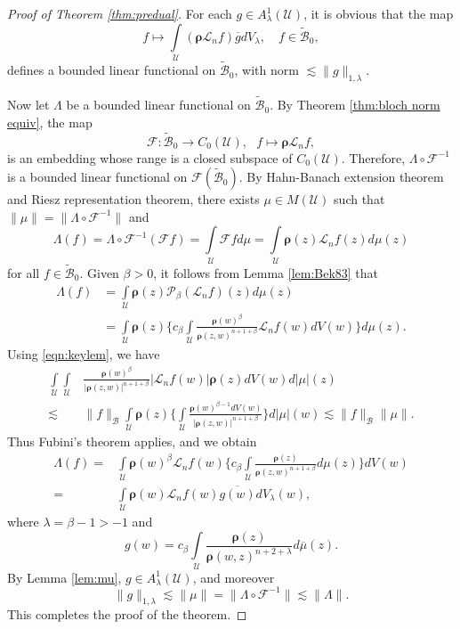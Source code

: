 \documentclass[10pt,a4paper]{amsart}
\newcommand{\bfL}{\mathcal{L}}
\newcommand{\bfrho}{\boldsymbol{\rho}}
\newcommand{\calB}{\mathcal{B}}
\newcommand{\calU}{\mathcal{U}}
\begin{document}
\begin{proof}[Proof of Theorem \ref{thm:predual}]
For each $g\in A_\lambda^1(\calU)$, it is obvious that the map
\[
f \longmapsto  \int\limits_{\calU} (\bfrho \bfL_n f )\overline{g} dV_\lambda,\quad f\in\widetilde{\calB}_0,
\]
defines a bounded linear functional on $\widetilde{\calB}_0$,  with norm $\lesssim\|g\|_{1,\lambda}$.

Now let $\Lambda$ be a bounded linear functional on $\widetilde{\calB}_0$.  
By Theorem \ref{thm:bloch norm equiv}, the map
\begin{equation*}\label{eq:map_L}
\mathcal{F}:\widetilde{\calB}_0 \to C_0(\calU),\ \ \ f \mapsto  \bfrho \bfL_n f,
\end{equation*}
is an embedding whose range is a closed subspace of $C_0(\calU)$.
Therefore, $\Lambda\circ \mathcal{F}^{-1}$
is a bounded linear functional on $\mathcal{F}(\widetilde{\calB}_0)$.
By Hahn-Banach extension theorem and Riesz representation theorem, there exists $\mu\in M(\calU)$ such that
$ \|\mu\|=\|\Lambda\circ \mathcal{F}^{-1}\|$ and
\[
\Lambda (f) = \Lambda\circ \mathcal{F}^{-1} (\mathcal{F} f) = \int\limits_{\calU} \mathcal{F} f d\mu
= \int\limits_{\calU} \bfrho(z) \bfL_n f(z) d\mu(z)
\]
for all $f\in \widetilde{\calB}_0$. Given $\beta>0$, it follows from Lemma \ref{lem:Bek83} that
\begin{align*}
\Lambda (f)&= \int\limits_{\calU} \bfrho(z) \mathcal{P}_\beta(\bfL_nf)(z) d\mu(z)\\
&= \int\limits_{\calU} \bfrho(z) \bigg\{ c_\beta
\int\limits_{\calU} \frac{\bfrho(w)^\beta}{\bfrho(z,w)^{n+1+\beta}} \bfL_n f(w) dV(w) \bigg\} d\mu(z).
\end{align*}
Using \eqref{eqn:keylem}, we have
\begin{align*}
\int\limits_{\calU} \int\limits_{\calU} & \frac {\bfrho(w)^\beta}{|\bfrho(z,w)|^{n+1+\beta}} |\bfL_n f(w)| \bfrho(z) dV(w) d|\mu|(z)\\
\lesssim &  \|f\|_{\calB} \int\limits_{\calU} \bfrho(z) \bigg\{\int\limits_{\calU}  \frac {\bfrho(w)^{\beta-1} dV(w)} {|\bfrho(z,w)|^{n+1+\beta}}
\bigg\} d|\mu|(w) 
\lesssim  \|f\|_{\calB} \|\mu\|.
\end{align*}
Thus Fubini's theorem applies, and we obtain
\begin{align*}
\Lambda(f) =&  \int\limits_{\calU} \bfrho(w)^\beta \bfL_n f(w) \bigg\{ c_\beta \int\limits_{\calU} \frac {\bfrho(z)}{\bfrho(z,w)^{n+1+\beta}} d\mu(z)\bigg\}  dV(w)\\
=&  \int\limits_{\calU} \bfrho(w) \bfL_n f(w) \overline{g(w)} dV_{\lambda}(w),
\end{align*}
where $\lambda=\beta-1>-1$ and 
\[
g(w) = c_\beta \int\limits_{\calU} \frac {\bfrho(z)}{\bfrho(w,z)^{n+2+\lambda}} d\overline{\mu}(z).
\]
By Lemma \ref{lem:mu}, $g\in A_\lambda^1(\calU)$, and moreover
\[
\|g\|_{1,\lambda}\lesssim \|\mu\|=\|\Lambda\circ \mathcal{F}^{-1}\| \lesssim \|\Lambda\|.
\]
This completes the proof of the theorem.
\end{proof}
\end{document}
